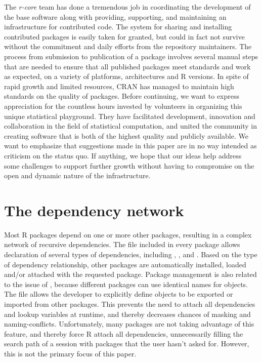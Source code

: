 The \emph{r-core} team has done a tremendous job in coordinating the development
of the base software along with providing, supporting, and maintaining an
infrastructure for contributed code. The system for sharing and installing
contributed packages is easily taken for granted, but could in fact not
survive without the commitment and daily efforts from the repository
maintainers. The process from submission to publication of a package involves
several manual steps that are needed to ensure that all published packages
meet standards and work as expected, on a variety of platforms, architectures
and R versions. In spite of rapid growth and limited resources, CRAN has
managed to maintain high standards on the quality of packages. Before
continuing, we want to express appreciation for the countless hours invested
by volunteers in organizing this unique statistical playground.
They have facilitated development, innovation and collaboration in the field of
statistical computation, and united the community in creating software that is
both of the highest quality and publicly available. We want to emphasize that
suggestions made in this paper are in no way intended as criticism on the status
quo. If anything, we hope that our ideas help address some challenges to support
further growth without having to compromise on the open and dynamic nature of
the infrastructure.

\section{The dependency network}

Most R packages depend on one or more other packages, resulting in a complex network
of recursive dependencies. The  file included in every package
allows declaration of several types of dependencies, including ,
,  and . Based on the type of
dependency relationship, other packages are automatically installed, loaded
and/or attached with the requested package. Package management is also related to the
issue of , because different packages can use identical names
for objects. The  file allows the developer to explicitly
define objects to be exported or imported from other packages. This prevents the
need to attach all dependencies and lookup variables at runtime, and thereby
decreases chances of masking and naming-conflicts. Unfortunately, many
packages are not taking advantage of this feature, and thereby force R 
attach all dependencies, unnecessarily filling the search path of a
session with packages that the user hasn't asked for. However, this is not the
primary focus of this paper.

